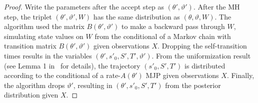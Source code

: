 \begin{proof}
Write the parameters after the accept step as $(\theta', \vartheta')$. 
After the MH step, the triplet $(\theta', \vartheta',W)$ has the same distribution as $(\theta, \vartheta,W)$.
The algorithm used the matrix $B(\theta',\vartheta')$ to make a backward pass through $W$, simulating state values on $W$ from the conditional of a Markov chain with transition matrix $B(\theta',\vartheta')$ given observations $X$. 
Dropping the self-transition times results in the variables $(\theta', s'_0, S', T', \vartheta')$. 
From the uniformization result (see Lemma 1 in~\cite{RaoTeh13} for details), the trajectory $(s'_0, S', T')$ is distributed according to the conditional of a rate-$A(\theta')$ MJP given observations $X$.
Finally, the algorithm drops $\vartheta'$, 
resulting in $(\theta',s'_0,S',T')$ from the posterior distribution given $X$.

\end{proof}
